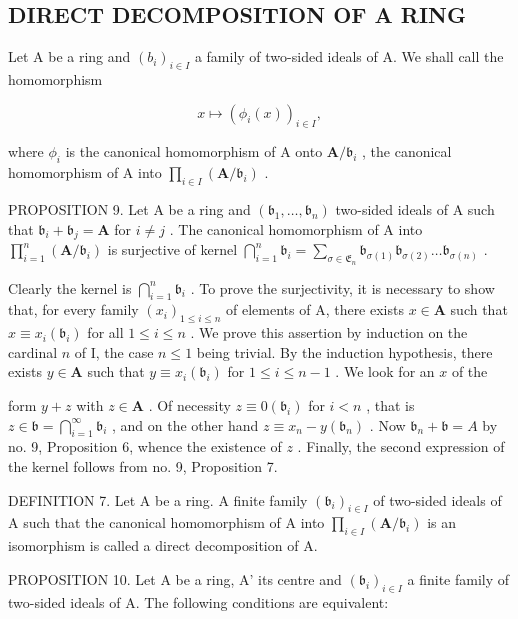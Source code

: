 \subsection{DIRECT DECOMPOSITION OF A RING}

Let A be a ring and \((b_{i})_{i\in I}\) a family of two-sided ideals of A. We shall call the homomorphism

\[
x \mapsto (\phi_ {i} (x)) _ {i \in I},
\]

where \(\phi_{i}\) is the canonical homomorphism of A onto \(\mathbf{A} / \mathfrak{b}_i\) , the canonical homomorphism of A into \(\prod_{i\in I}(\mathbf{A} / \mathfrak{b}_i)\) .

PROPOSITION 9. Let A be a ring and \((\mathfrak{b}_1, \ldots, \mathfrak{b}_n)\) two-sided ideals of A such that \(\mathfrak{b}_i + \mathfrak{b}_j = \mathbf{A}\) for \(i \neq j\) . The canonical homomorphism of A into \(\prod_{i=1}^{n} (\mathbf{A} / \mathfrak{b}_i)\) is surjective of kernel \(\bigcap_{i=1}^{n} \mathfrak{b}_i = \sum_{\sigma \in \mathfrak{E}_n} \mathfrak{b}_{\sigma(1)} \mathfrak{b}_{\sigma(2)} \ldots \mathfrak{b}_{\sigma(n)}\) .

Clearly the kernel is \(\bigcap_{i=1}^{n} \mathfrak{b}_i\) . To prove the surjectivity, it is necessary to show that, for every family \((x_i)_{1 \leqslant i \leqslant n}\) of elements of A, there exists \(x \in \mathbf{A}\) such that \(x \equiv x_i (\mathfrak{b}_i)\) for all \(1 \leqslant i \leqslant n\) . We prove this assertion by induction on the cardinal \(n\) of I, the case \(n \leqslant 1\) being trivial. By the induction hypothesis, there exists \(y \in \mathbf{A}\) such that \(y \equiv x_i (\mathfrak{b}_i)\) for \(1 \leqslant i \leqslant n-1\) . We look for an \(x\) of the

form \(y + z\) with \(z \in \mathbf{A}\) . Of necessity \(z \equiv 0(\mathfrak{b}_i)\) for \(i < n\) , that is \(z \in \mathfrak{b} = \bigcap_{i=1}^{\infty} \mathfrak{b}_i\) , and on the other hand \(z \equiv x_n - y(\mathfrak{b}_n)\) . Now \(\mathfrak{b}_n + \mathfrak{b} = A\) by no. 9, Proposition 6, whence the existence of \(z\) . Finally, the second expression of the kernel follows from no. 9, Proposition 7.

DEFINITION 7. Let A be a ring. A finite family \((\mathfrak{b}_i)_{i\in I}\) of two-sided ideals of A such that the canonical homomorphism of A into \(\prod_{i\in I}(\mathbf{A} / \mathfrak{b}_i)\) is an isomorphism is called a direct decomposition of A.

PROPOSITION 10. Let A be a ring, A' its centre and \((\mathfrak{b}_{i})_{i\in I}\) a finite family of two-sided ideals of A. The following conditions are equivalent:

